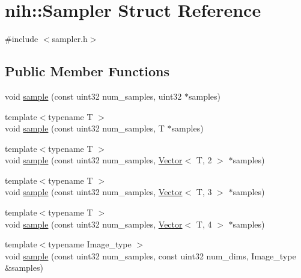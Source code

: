 \hypertarget{structnih_1_1_sampler}{
\section{nih\-:\-:\-Sampler \-Struct \-Reference}
\label{structnih_1_1_sampler}
}


{\ttfamily \#include $<$sampler.\-h$>$}

\subsection*{\-Public \-Member \-Functions}
\begin{DoxyCompactItemize}
\item 
void \hyperlink{structnih_1_1_sampler_a393317f10a5ada969a41cf1f037bc900}{sample} (const uint32 num\-\_\-samples, uint32 $\ast$samples)
\item 
{\footnotesize template$<$typename T $>$ }\\void \hyperlink{structnih_1_1_sampler_a24346176a69c4450e74f760d65b6c287}{sample} (const uint32 num\-\_\-samples, \-T $\ast$samples)
\item 
{\footnotesize template$<$typename T $>$ }\\void \hyperlink{structnih_1_1_sampler_a133bf443ccb7341c8faccecbdbafaa3e}{sample} (const uint32 num\-\_\-samples, \hyperlink{structnih_1_1_vector}{\-Vector}$<$ \-T, 2 $>$ $\ast$samples)
\item 
{\footnotesize template$<$typename T $>$ }\\void \hyperlink{structnih_1_1_sampler_ab533b105cb9adc3d64d9fe71015321ef}{sample} (const uint32 num\-\_\-samples, \hyperlink{structnih_1_1_vector}{\-Vector}$<$ \-T, 3 $>$ $\ast$samples)
\item 
{\footnotesize template$<$typename T $>$ }\\void \hyperlink{structnih_1_1_sampler_aaf4d230e452992719e6c17d5224ae2b4}{sample} (const uint32 num\-\_\-samples, \hyperlink{structnih_1_1_vector}{\-Vector}$<$ \-T, 4 $>$ $\ast$samples)
\item 
{\footnotesize template$<$typename Image\-\_\-type $>$ }\\void \hyperlink{structnih_1_1_sampler_ae4d59f4b95488b3b8d6c7559ec1bb6ef}{sample} (const uint32 num\-\_\-samples, const uint32 num\-\_\-dims, \-Image\-\_\-type \&samples)
\end{DoxyCompactItemize}
